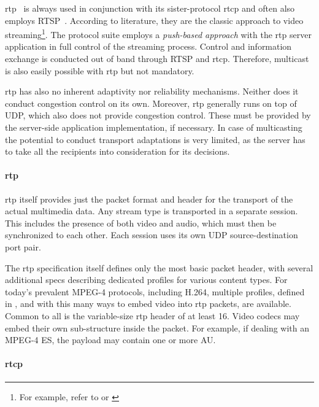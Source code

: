\gls{rtp}~\cite{rfc3550} is always used in conjunction with its sister-protocol \gls{rtcp} and often also employs \gls{RTSP}~\cite{rfc2326}. According to literature, they are the classic approach to video streaming\footnote{For example, refer to \cite[p.~589ff]{kurose2008computer} or \cite[p.~426ff]{peterson2007computer}}.
The protocol suite employs a \textit{push-based approach} with the \gls{rtp} server application in full control of the streaming process. Control and information exchange is conducted out of band through \gls{RTSP} and \gls{rtcp}. Therefore, multicast is also easily possible with \gls{rtp} but not mandatory.

\gls{rtp} has also no inherent adaptivity nor reliability mechanisms. Neither does it conduct congestion control on its own. Moreover, \gls{rtp} generally runs on top of \gls{UDP}, which also does not provide congestion control. These must be provided by the server-side application implementation, if necessary. In case of multicasting the potential to conduct transport adaptations is very limited, as the server has to take all the recipients into consideration for its decisions.


\paragraph{\gls{rtp}}

\gls{rtp} itself provides just the packet format and header for the transport of the actual multimedia data. Any stream type is transported in a separate session. This includes the presence of both video and audio, which must then be synchronized to each other. Each session uses its own \gls{UDP} source-destination port pair.

The \gls{rtp} specification itself defines only the most basic packet header, with several additional specs describing dedicated profiles for various content types. For today's prevalent MPEG-4 protocols, including H.264, multiple profiles, defined in \cite{rfc3640,rfc6184,rfc6416}, and with this many ways to embed video into \gls{rtp} packets, are available. Common to all is the variable-size \gls{rtp} header of at least \SI{16}{\byte}. Video codecs may embed their own sub-structure inside the packet. For example, if dealing with an MPEG-4 \gls{ES}, the payload may contain one or more \gls{AU}.


\paragraph{\texorpdfstring{\acrshort{rtcp}}{rtcp}}

